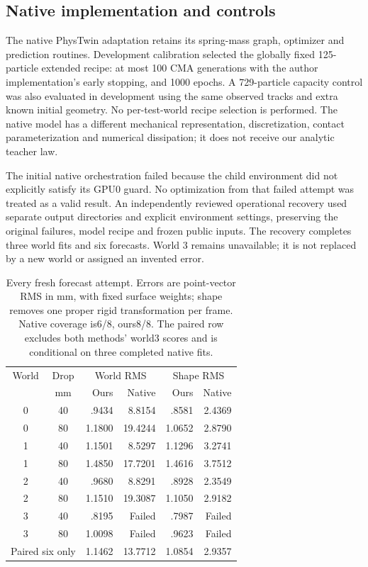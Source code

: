 \documentclass[10pt,twocolumn,letterpaper]{article}
\begin{document}
\subsection{Native implementation and controls}
The native PhysTwin adaptation retains its spring-mass graph, optimizer and prediction routines. Development calibration selected the globally fixed 125-particle extended recipe: at most 100 CMA generations with the author implementation's early stopping, and 1000 epochs. A 729-particle capacity control was also evaluated in development using the same observed tracks and extra known initial geometry. No per-test-world recipe selection is performed. The native model has a different mechanical representation, discretization, contact parameterization and numerical dissipation; it does not receive our analytic teacher law.

The initial native orchestration failed because the child environment did not explicitly satisfy its GPU0 guard. No optimization from that failed attempt was treated as a valid result. An independently reviewed operational recovery used separate output directories and explicit environment settings, preserving the original failures, model recipe and frozen public inputs. The recovery completes three world fits and six forecasts. World 3 remains unavailable; it is not replaced by a new world or assigned an invented error.

\begin{table}[t]
\centering\small
\begin{tabular}{ccrrrr}
\toprule
World & Drop & \multicolumn{2}{c}{World RMS} & \multicolumn{2}{c}{Shape RMS}\\
& mm & Ours & Native & Ours & Native\\
\midrule
0&40&.9434&8.8154&.8581&2.4369\\
0&80&1.1800&19.4244&1.0652&2.8790\\
1&40&1.1501&8.5297&1.1296&3.2741\\
1&80&1.4850&17.7201&1.4616&3.7512\\
2&40&.9680&8.8291&.8928&2.3549\\
2&80&1.1510&19.3087&1.1050&2.9182\\
3&40&.8195&Failed&.7987&Failed\\
3&80&1.0098&Failed&.9623&Failed\\
\midrule
\multicolumn{2}{l}{Paired six only}&1.1462&13.7712&1.0854&2.9357\\
\bottomrule
\end{tabular}
\caption{Every fresh forecast attempt. Errors are point-vector RMS in mm, with fixed surface weights; shape removes one proper rigid transformation per frame. Native coverage is6/8, ours8/8. The paired row excludes both methods' world3 scores and is conditional on three completed native fits.}
\label{sim-tab:fresh}
\end{table}
\end{document}
